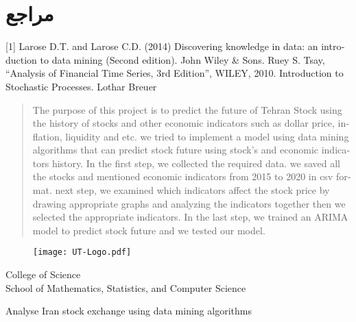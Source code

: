 \documentclass[12pt]{report}
\begin{document}
\chapter*{مراجع}
\begin{latin}
[1] Larose D.T. and Larose C.D. (2014) Discovering knowledge in data: an introduction to data mining (Second edition). John Wiley \& Sons.
\newline
\newline
[2] Ruey S. Tsay, “Analysis of Financial Time Series, 3rd Edition”, WILEY, 2010.
\newline
\newline
[3] Introduction to Stochastic Processes. Lothar Breuer 
\newline
\end{latin}

\begin{latin}
\begin{abstract}
The purpose of this project is to predict the future of Tehran Stock using the history of stocks and other economic indicators such as dollar price, inflation, liquidity and etc. we tried to implement a model using data mining algorithms that can predict stock future using stock's and economic indicators history. In the first step, we collected the required data. we saved all the stocks and mentioned economic indicators from 2015 to 2020 in csv format. next step, we examined which indicators affect the stock price by drawing appropriate graphs and analyzing the indicators together then we selected the appropriate indicators. In the last step, we trained an ARIMA model to predict stock future and we tested our model.
\end{abstract}
\newpage

\begin{figure}
\centering
\texttt{[image: UT-Logo.pdf]}
\end{figure}
\begin{center}

College of Science\\
School of Mathematics, Statistics, and Computer Science
\end{center}

\begin{center}
\huge{Analyse Iran stock exchange using data mining algorithms}
\end{center}

\begin{center}
\end{center}


\end{latin}
\end{document}
